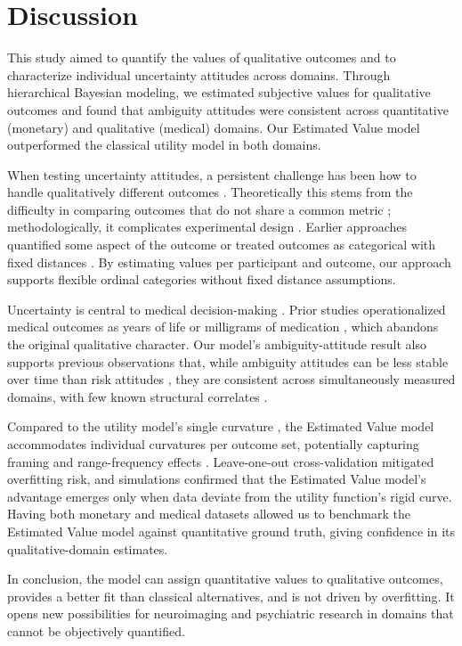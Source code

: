 \documentclass[11pt]{article}
\begin{document}
\section{Discussion}
This study aimed to quantify the values of qualitative outcomes and to characterize individual uncertainty attitudes across domains. Through hierarchical Bayesian modeling, we estimated subjective values for qualitative outcomes and found that ambiguity attitudes were consistent across quantitative (monetary) and qualitative (medical) domains. Our Estimated Value model outperformed the classical utility model in both domains.

When testing uncertainty attitudes, a persistent challenge has been how to handle qualitatively different outcomes \cite{tversky1988contingent}. Theoretically this stems from the difficulty in comparing outcomes that do not share a common metric \cite{dehaene1997numerical}; methodologically, it complicates experimental design \cite{gigerenzer1999simple}. Earlier approaches quantified some aspect of the outcome \cite{tymula2023exchanging,tymula2020social,frey2017risk} or treated outcomes as categorical with fixed distances \cite{xu2021ambiguity}. By estimating values per participant and outcome, our approach supports flexible ordinal categories without fixed distance assumptions.

Uncertainty is central to medical decision-making \cite{politi2011communicating,han2011uncertainty}. Prior studies operationalized medical outcomes as years of life \cite{tymula2023exchanging,bleichrodt2008health} or milligrams of medication \cite{tymula2020social}, which abandons the original qualitative character. Our model's ambiguity-attitude result also supports previous observations that, while ambiguity attitudes can be less stable over time than risk attitudes \cite{xu2021ambiguity,tymula2013aging}, they are consistent across simultaneously measured domains, with few known structural correlates \cite{huettel2006neural,levy2010neural}.

Compared to the utility model's single curvature \cite{prelec1998probability}, the Estimated Value model accommodates individual curvatures per outcome set, potentially capturing framing and range-frequency effects \cite{tversky1981framing,parducci1965category,stewart2003prospect}. Leave-one-out cross-validation mitigated overfitting risk, and simulations confirmed that the Estimated Value model's advantage emerges only when data deviate from the utility function's rigid curve. Having both monetary and medical datasets allowed us to benchmark the Estimated Value model against quantitative ground truth, giving confidence in its qualitative-domain estimates.

In conclusion, the model can assign quantitative values to qualitative outcomes, provides a better fit than classical alternatives, and is not driven by overfitting. It opens new possibilities for neuroimaging and psychiatric research in domains that cannot be objectively quantified.



\end{document}
